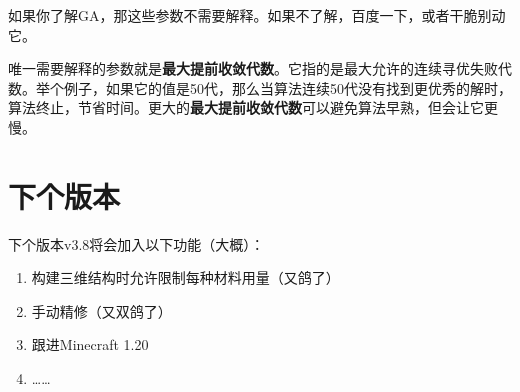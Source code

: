 \documentclass[UTF8]{ctexart}
\begin{document}
如果你了解GA，那这些参数不需要解释。如果不了解，百度一下，或者干脆别动它。

唯一需要解释的参数就是\textbf{最大提前收敛代数}。它指的是最大允许的连续寻优失败代数。举个例子，如果它的值是50代，那么当算法连续50代没有找到更优秀的解时，算法终止，节省时间。更大的\textbf{最大提前收敛代数}可以避免算法早熟，但会让它更慢。

\section{下个版本}
下个版本v3.8将会加入以下功能（大概）：
\begin{enumerate}
    \item 构建三维结构时允许限制每种材料用量（又鸽了）
    \item 手动精修（又双鸽了）
    \item 跟进Minecraft 1.20
    \item ……
\end{enumerate}
\end{document}
